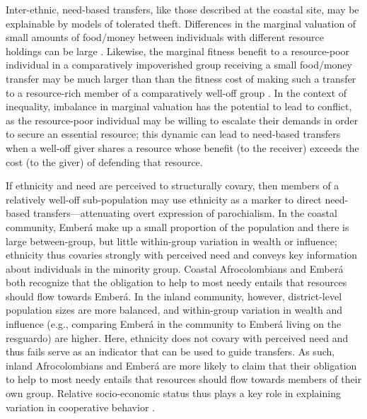 \documentclass[bibauthoryear]{aa}
\begin{document}


Inter-ethnic, need-based transfers, like those described at the coastal site, may be explainable by models of tolerated theft. Differences in the marginal valuation of small amounts of food/money between individuals with different resource holdings can be large \citep{jones1984selfish, winterhalder1996marginal}. Likewise, the marginal fitness benefit to a resource-poor individual in a comparatively impoverished group receiving a small food/money transfer may be much larger than than the fitness cost of making such a transfer to a resource-rich member of a comparatively well-off group  \citep{winterhalder1997gifts}. In the context of inequality, imbalance in marginal valuation has the potential to lead to conflict, as the resource-poor individual may be willing to escalate their demands in order to secure an essential resource; this dynamic can lead to need-based transfers when a well-off giver shares a resource whose benefit (to the receiver) exceeds the cost (to the giver) of defending that resource.

 If ethnicity and need are perceived to structurally covary, then members of a relatively well-off sub-population may use ethnicity as a marker to direct need-based transfers---attenuating overt expression of parochialism. In the coastal community, Ember\'a make up a small proportion of the population and there is large between-group, but little within-group variation in wealth or influence; ethnicity thus covaries strongly with perceived need and conveys key information about individuals in the minority group. Coastal Afrocolombians and Ember\'a both recognize that the obligation to help to most needy entails that resources should flow towards Ember\'a.  In the inland community, however, district-level population sizes are more balanced, and within-group variation in wealth and influence (e.g., comparing Ember\'a in the community to Ember\'a living on the resguardo) are higher. Here, ethnicity does not covary with perceived need and thus fails serve as an indicator that can be used to guide transfers. As such, inland Afrocolombians and Ember\'a are more likely to claim that their obligation to help to most needy entails that resources should flow towards members of their own group. Relative socio-economic status thus plays a key role in explaining variation in cooperative behavior \citep[see also, ][]{silva2014cooperation}.
\end{document}
